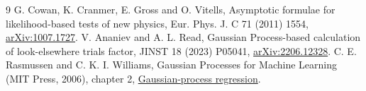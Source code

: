 \documentclass[10pt]{article}
\begin{document}
\begin{thebibliography}{9}\small
{} G. Cowan, K. Cranmer, E. Gross and O. Vitells,
Asymptotic formulae for likelihood-based tests of new physics,
Eur. Phys. J. C 71 (2011) 1554,
\href{https://arxiv.org/abs/1007.1727}{arXiv:1007.1727}.
 V. Ananiev and A. L. Read,
Gaussian Process-based calculation of look-elsewhere trials factor,
JINST 18 (2023) P05041,
\href{https://arxiv.org/abs/2206.12328}{arXiv:2206.12328}.
 C. E. Rasmussen and C. K. I. Williams,
Gaussian Processes for Machine Learning (MIT Press, 2006), chapter 2,
\href{https://gaussianprocess.org/gpml/chapters/RW2.pdf}{Gaussian-process regression}.
\end{thebibliography}
\end{document}
